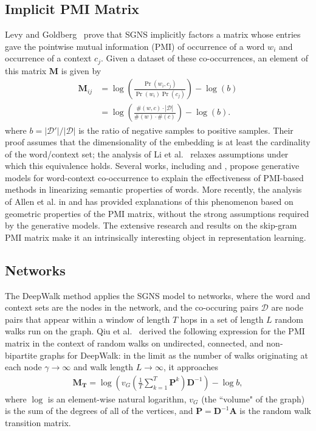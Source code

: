 \documentclass[sigconf]{acmart}
\newcommand{\mbf}[1]{\mathbf{#1}}
\begin{document}
\subsection{Implicit PMI Matrix} Levy and Goldberg~\cite{levy2014neural} prove that SGNS implicitly factors a matrix whose entries gave the pointwise mutual information (PMI) of occurrence of a word $w_i$ and occurrence of a context $c_j$. Given a dataset of these co-occurrences, an element of this matrix $\mbf{M}$ is given by
%
\begin{align*}
    \mbf{M}_{ij} &= \log \left( \frac{\Pr(w_i,c_j)}{\Pr(w_i)\Pr(c_j)} \right) - \log(b) \\
    &= \log \left( \frac{\#(w,c) \cdot |\mathcal{D}|}{\#(w) \cdot \#(c)} \right) - \log(b) .
\end{align*}
%
where $b = |\mathcal{D'}| / |\mathcal{D}|$ is the ratio of negative samples to positive samples. Their proof assumes that the dimensionality of the embedding is at least the cardinality of the word/context set; the analysis of Li et al.~\cite{li2015word} relaxes assumptions under which this equivalence holds. Several works, including \cite{arora2016latent} and \cite{gittens2017skip}, propose generative models for word-context co-occurrence to explain the effectiveness of PMI-based methods in linearizing semantic properties of words. More recently, the analysis of Allen et al. in \cite{allen2019vec} and \cite{allen2019analogies} has provided explanations of this phenomenon based on geometric properties of the PMI matrix, without the strong assumptions required by the generative models.
The extensive research and results on the skip-gram PMI matrix make it an intrinsically interesting object in representation learning.

\subsection{Networks} The DeepWalk method \cite{perozzi2014deepwalk} applies the SGNS model to networks, where the word and context sets are the nodes in the network, and the co-occuring pairs $\mathcal{D}$ are node pairs  that appear within a window of length $T$ hops in a set of length $L$ random walks run on the graph.
Qiu et al.~\cite{qiu2018network} derived the following expression for the PMI matrix in the context of random walks on undirected, connected, and non-bipartite graphs for DeepWalk: in the limit as the number of walks originating at each node $\gamma \to \infty$ and walk length $L\to \infty$, it approaches
%
\begin{align}\label{eq:netMF} \mbf{M_T} = \log\left( v_G \left( \tfrac{1}{T} \sum_{k=1}^T \mbf{P}^k \right) \mbf{D}^{-1} \right) - \log{b} , 
\end{align}
where $\log$ is an element-wise natural logarithm, $v_G$ (the ``volume" of the graph) is the sum of the degrees of all of the vertices, and $\mbf{P}=\mbf{D}^{-1} \mbf{A}$ is the random walk transition matrix.
\end{document}
